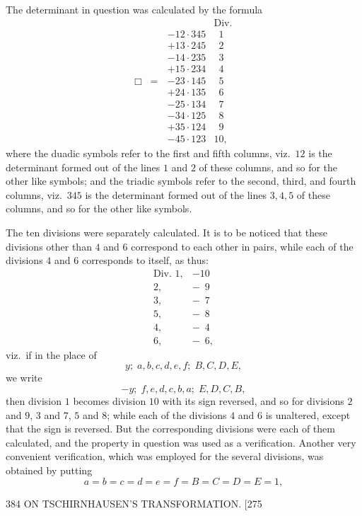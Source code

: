 \documentclass[11pt]{article}
\begin{document}
The determinant in question was calculated by the formula
\[ \Box \;=\;
\begin{array}{rl}
            & \text{Div.}\\
 -12\cdot 345 & \phantom{0}1\\
 +13\cdot 245 & \phantom{0}2\\
 -14\cdot 235 & \phantom{0}3\\
 +15\cdot 234 & \phantom{0}4\\
 -23\cdot 145 & \phantom{0}5\\
 +24\cdot 135 & \phantom{0}6\\
 -25\cdot 134 & \phantom{0}7\\
 -34\cdot 125 & \phantom{0}8\\
 +35\cdot 124 & \phantom{0}9\\
 -45\cdot 123 & 10,
\end{array}
\]
where the duadic symbols refer to the first and fifth columns, viz.\ $12$ is the
determinant formed out of the lines $1$ and $2$ of these columns, and so for the other like
symbols; and the triadic symbols refer to the second, third, and fourth columns,
viz.\ $345$ is the determinant formed out of the lines $3,4,5$ of these columns, and so
for the other like symbols.

The ten divisions were separately calculated. It is to be noticed that these
divisions other than $4$ and $6$ correspond to each other in pairs, while each of the
divisions $4$ and $6$ corresponds to itself, as thus:
\[
\begin{array}{rr}
\text{Div. } 1, & -10\\
2, & -\phantom{0}9\\
3, & -\phantom{0}7\\
5, & -\phantom{0}8\\
4, & -\phantom{0}4\\
6, & -\phantom{0}6,
\end{array}
\]
viz.\ if in the place of
\[ y;\;a,b,c,d,e,f;\;B,C,D,E, \]
we write
\[ -y;\;f,e,d,c,b,a;\;E,D,C,B, \]
then division $1$ becomes division $10$ with its sign reversed, and so for divisions
$2$ and $9$, $3$ and $7$, $5$ and $8$; while each of the divisions $4$ and $6$ is unaltered, except
that the sign is reversed. But the corresponding divisions were each of them calculated,
and the property in question was used as a verification. Another very convenient
verification, which was employed for the several divisions, was obtained by putting
\[ a=b=c=d=e=f=B=C=D=E=1, \]

\begin{center}
384 \hfill ON TSCHIRNHAUSEN'S TRANSFORMATION. \hfill \textsc{[275}
\end{center}
\end{document}
